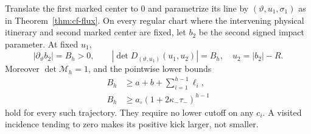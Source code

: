 \begin{theorem}
\label{thm:xf-jacobian}
Translate the first marked center to $0$ and parametrize its line by
$(\vartheta,u_1,\sigma_1)$ as in Theorem~\ref{thm:cf-flux}.
On every regular chart where the intervening physical itinerary and
second marked center are fixed, let $b_2$ be the second signed impact
parameter. At fixed $u_1$,
\begin{equation}\label{eq:xf-jacobian}
 \left|\partial_\vartheta b_2\right|=B_h>0,
 \qquad
 \left|\det D_{(\vartheta,u_1)}(u_1,u_2)\right|=B_h,
 \quad u_2=|b_2|-R.
\end{equation}
Moreover $\det\mathcal M_h=1$, and the pointwise lower bounds
\begin{align}
 B_h&\ge a+b+\sum_{i=1}^{h-1}\ell_i,\label{eq:xf-length-lower}\\
 B_h&\ge a_\circ(1+2\kappa_-\tau_-)^{h-1}
                                      \label{eq:xf-exponential-lower}
\end{align}
hold for every such trajectory. They require no lower cutoff on any
$c_i$. A visited incidence tending to zero makes its positive kick
larger, not smaller.
\end{theorem}
